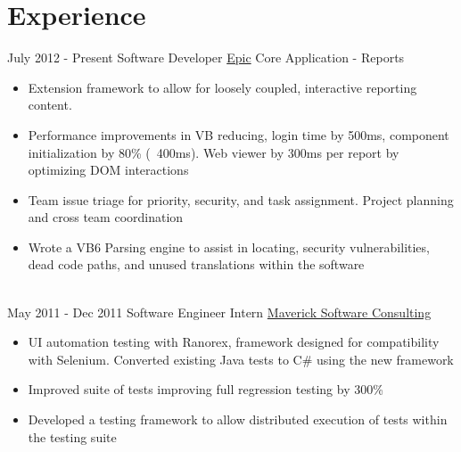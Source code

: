 \documentclass[letterpaper]{twentysecondcv} %
\begin{document}
\makeprofile %


\section{Experience}

\begin{twenty} %
\twentyitem
    	{July 2012 -}
		{Present}
        {Software Developer}
        {\href{https://www.epic.com/}{Epic}}
        {Core Application - Reports}
        {\begin{itemize}
   		\item Extension framework to allow for loosely coupled, interactive reporting content.
   		
   		\item Performance improvements in VB reducing, login time by 500ms, component initialization by 80\% (~400ms). Web viewer by 300ms per report by optimizing DOM interactions
   		
   		\item Team issue triage for priority, security, and task assignment. Project planning and cross team coordination
   		
   		\item Wrote a VB6 Parsing engine to assist in locating, security vulnerabilities, dead code paths, and unused translations within the software
        \end{itemize}}
        \\
	\twentyitem
		{May 2011 -}
		{Dec 2011}
        {Software Engineer Intern}
        {\href{http://www.mavericksoftware.com/}{Maverick Software Consulting}}
        {}
        {
        {\begin{itemize}
        \item UI automation testing with Ranorex, framework designed for compatibility with Selenium. Converted existing Java tests to C\# using the new framework
        \item Improved suite of tests improving full regression testing by 300\%
        
        \item Developed a testing framework to allow distributed execution of tests within the testing suite
        

\end{itemize}}}
\end{twenty}
\end{document}
